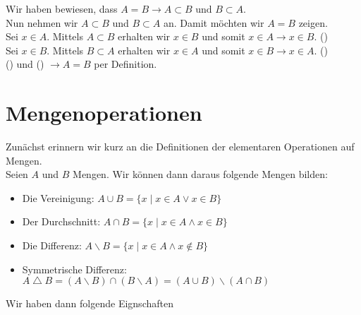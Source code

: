Wir haben bewiesen, dass $A=B \to A\subset B \text{ und } B\subset A$. \\
Nun nehmen wir $A\subset B$ und $B\subset A$ an. Damit möchten wir $A=B$ zeigen. \\

Sei $x\in A$. Mittels $A\subset B$ erhalten wir $x\in B$ und somit $x\in A \to x\in B$. (\textasteriskcentered)\\

Sei $x\in B$. Mittels $B\subset A$ erhalten wir $x\in A$ und somit $x\in B \to x\in A$. (\textasteriskcentered\textasteriskcentered)\\

(\textasteriskcentered) und (\textasteriskcentered\textasteriskcentered) $\to A=B$ per Definition. 

\section{Mengenoperationen}
Zunächst erinnern wir kurz an die Definitionen der elementaren Operationen auf Mengen. \\

\noindent Seien $A$ und $B$ Mengen. Wir können dann daraus folgende Mengen bilden:

\begin{itemize}
\item Die Vereinigung: $A\cup B=\{x\mid x\in A \lor x\in B\}$
\item Der Durchschnitt: $A\cap B=\{x\mid x\in A \land x\in B\}$
\item Die Differenz: $A\backslash B=\{x\mid x\in A \land x\not\in B\}$
\item Symmetrische Differenz: $A\bigtriangleup B=\left(A\backslash B\right) \cap \left(B\backslash A\right)=\left(A\cup B\right)\backslash\left(A\cap B\right)$
\end{itemize}

Wir haben dann folgende Eignschaften
